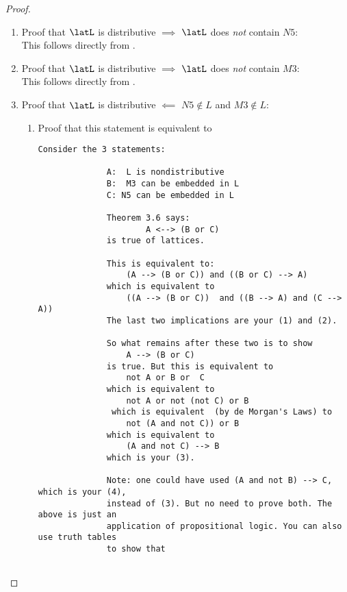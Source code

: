 \begin{proof}
\begin{enumerate}
  \item Proof that $\latL$ is distributive $\implies$ $\latL$ does \emph{not} contain $N5$:\\
    This follows directly from .

  \item Proof that $\latL$ is distributive $\implies$ $\latL$ does \emph{not} contain $M3$:\\
    This follows directly from .

  \item Proof that $\latL$ is distributive $\impliedby$ $N5\notin L$ and $M3\notin L$:



    \begin{enumerate}
      \item Proof that this statement is equivalent to
        {\begin{minipage}[t]{2\tw/16+1ex}%
            \fontsize{0.5mm}{0.5mm}%
            \begin{Verbatim}[frame=single, gobble=8, label={\footnotesize\rmfamily email}]
              Consider the 3 statements:

              A:  L is nondistributive
              B:  M3 can be embedded in L
              C: N5 can be embedded in L

              Theorem 3.6 says:
                      A <--> (B or C)
              is true of lattices.

              This is equivalent to:
                  (A --> (B or C)) and ((B or C) --> A)
              which is equivalent to
                  ((A --> (B or C))  and ((B --> A) and (C --> A))
              The last two implications are your (1) and (2).

              So what remains after these two is to show
                  A --> (B or C)
              is true. But this is equivalent to
                  not A or B or  C
              which is equivalent to
                  not A or not (not C) or B
               which is equivalent  (by de Morgan's Laws) to
                  not (A and not C)) or B
              which is equivalent to
                  (A and not C) --> B
              which is your (3).

              Note: one could have used (A and not B) --> C, which is your (4),
              instead of (3). But no need to prove both. The above is just an
              application of propositional logic. You can also use truth tables
              to show that


\end{Verbatim}
\end{minipage}}
\end{enumerate}
\end{enumerate}
\end{proof}
